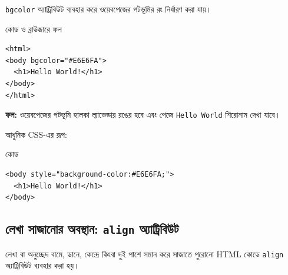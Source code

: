 \texttt{bgcolor} অ্যাট্রিবিউট ব্যবহার করে ওয়েবপেজের পটভূমির রং নির্ধারণ করা যায়।

\begin{chFourWholeExample}{কোড ও ব্রাউজারে ফল}
\noindent
\begin{minipage}[t]{.50\linewidth}\vspace{0pt}

\begin{verbatim}
<html>
<body bgcolor="#E6E6FA">
  <h1>Hello World!</h1>
</body>
</html>
\end{verbatim}

\end{minipage}\hfill
\begin{minipage}[t]{.46\linewidth}\vspace{0pt}
\textbf{ফল:} ওয়েবপেজের পটভূমি হালকা ল্যাভেন্ডার রঙের হবে এবং পেজে \texttt{Hello World} শিরোনাম দেখা যাবে।\\
\end{minipage}
\end{chFourWholeExample}

আধুনিক CSS-এর রূপ:

\begin{examplebox}{কোড}
\par\noindent\begin{minipage}{\linewidth}
\begin{verbatim}
<body style="background-color:#E6E6FA;">
  <h1>Hello World!</h1>
</body>
\end{verbatim}
\end{minipage}\par
\end{examplebox}

\subsection{লেখা সাজানোর অবস্থান: \texttt{align} অ্যাট্রিবিউট}

লেখা বা অনুচ্ছেদ বামে, ডানে, কেন্দ্রে কিংবা দুই পাশে সমান করে সাজাতে পুরোনো HTML কোডে \texttt{align} অ্যাট্রিবিউট ব্যবহার করা হয়।

